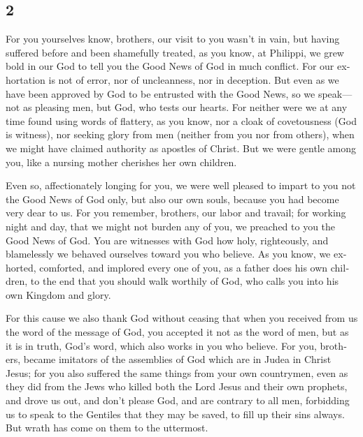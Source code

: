 \begin{paracol}{2}
\begin{otherlanguage}{english}
\hypertarget{section-3}{%
\section{2}\label{section-3}}

 For you yourselves know, brothers, our visit to you
wasn't in vain,  but having suffered before and been
shamefully treated, as you know, at Philippi, we grew bold in our God to
tell you the Good News of God in much conflict.  For our
exhortation is not of error, nor of uncleanness, nor in deception.
 But even as we have been approved by God to be entrusted
with the Good News, so we speak---not as pleasing men, but God, who
tests our hearts.  For neither were we at any time found
using words of flattery, as you know, nor a cloak of covetousness (God
is witness),  nor seeking glory from men (neither from you
nor from others), when we might have claimed authority as apostles of
Christ.  But we were gentle among you, like a nursing
mother cherishes her own children.

 Even so, affectionately longing for you, we were well
pleased to impart to you not the Good News of God only, but also our own
souls, because you had become very dear to us.  For you
remember, brothers, our labor and travail; for working night and day,
that we might not burden any of you, we preached to you the Good News of
God.  You are witnesses with God how holy, righteously,
and blamelessly we behaved ourselves toward you who believe.
 As you know, we exhorted, comforted, and implored every
one of you, as a father does his own children,  to the
end that you should walk worthily of God, who calls you into his own
Kingdom and glory.

 For this cause we also thank God without ceasing that
when you received from us the word of the message of God, you accepted
it not as the word of men, but as it is in truth, God's word, which also
works in you who believe.  For you, brothers, became
imitators of the assemblies of God which are in Judea in Christ Jesus;
for you also suffered the same things from your own countrymen, even as
they did from the Jews  who killed both the Lord Jesus
and their own prophets, and drove us out, and don't please God, and are
contrary to all men,  forbidding us to speak to the
Gentiles that they may be saved, to fill up their sins always. But wrath
has come on them to the uttermost.


\end{otherlanguage}
\end{paracol}
